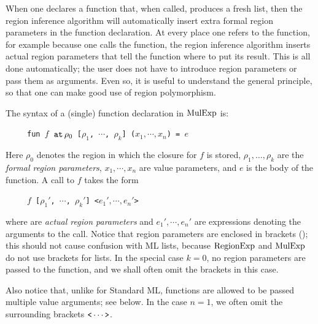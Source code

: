 \documentclass[12pt]{book}
\begin{document}
When one declares a function that, when called, produces a fresh list,
then the region inference algorithm will automatically insert extra
%
formal region parameters in the function declaration.  At every place
one refers to the function, for example because one calls the
function, the region inference algorithm inserts
%
actual region parameters that tell the function where to put its
result. This is all done automatically; the user does not have to
introduce region parameters or pass them as arguments. Even so, it is
useful to understand the general principle, so that one can make good
use of region polymorphism.

The syntax of a (single) function declaration in $\hbox{\rm MulExp}$ is:
\begin{tabbing}
\ \ \ \ \ \=\tt fun $f$ $\mathbin{\hbox{\tt at}}\,\rho_0$ [$\rho_1$, $\cdots$, $\rho_k$] ($x_1,\cdots,x_n$) = $e$
\end{tabbing}
Here $\rho_0$ denotes the region in which the closure for $f$ is
stored, $\rho_1, \ldots,\rho_k$ are the
%
{\em formal region parameters}, $x_1,\cdots,x_n$ are
value parameters, and $e$ is the body of the function.
A call to $f$ takes the form
\begin{tabbing}
\ \ \ \ \ \=\tt $f$  [$\rho_1'$, $\cdots$, $\rho_k'$] <$e_1',\cdots,e_n'$>
\end{tabbing}
where  are
%
{\em actual region parameters} and $e_1',\cdots,e_n'$ are expressions
denoting the arguments to the call. Notice that region parameters are
enclosed in brackets (\boxml{[ ]}); this should not cause confusion
with ML lists, because $\hbox{\rm RegionExp}$ and $\hbox{\rm MulExp}$ do not use
%
brackets for lists. In the special case $k=0$, no region parameters
are passed to the function, and we shall often omit the brackets in
this case.

Also notice that, unlike for Standard ML, functions are allowed to be
passed multiple value arguments; see below. In the case $n=1$, we
often omit the surrounding brackets $\verb+<+ \cdots \verb+>+$.
\end{document}
